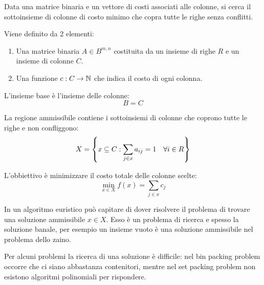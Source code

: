 \documentclass[\main/main.tex]{subfiles}
\begin{document}
\begin{multicols}{2}
    \begin{problem}
        Data una matrice binaria e un vettore di costi associati alle colonne, si cerca il sottoinsieme di colonne di costo minimo che copra tutte le righe senza conflitti.
        
        Viene definito da 2 elementi:
        \begin{enumerate}
            \item Una matrice binaria \(A \in B^{m,n}\) costituita da un insieme di righe \(R\) e un insieme di colonne \(C\).
            \item Una funzione \(c: C \rightarrow \mathbb{N}\) che indica il costo di ogni colonna.
        \end{enumerate}
    \end{problem}
    \begin{definition}
        L'insieme base è l'insieme delle colonne:
        \[
            B = C
        \]
    \end{definition}
    \begin{definition}
        La regione ammissibile contiene i sottoinsiemi di colonne che coprono tutte le righe e non confliggono:
        \[
            X = \left\{x \subseteq C: \sum_{j \in x} a_{ij} = 1 \quad \forall i \in R\right\}
        \]
    \end{definition}
    \begin{definition}
        L'obbiettivo è minimizzare il costo totale delle colonne scelte:
        \[
            \min_{x \in X} f(x) = \sum_{j \in x} c_j
        \]
    \end{definition}
    \begin{observation}
        In un algoritmo euristico può capitare di dover risolvere il problema di trovare una soluzione ammissibile \(x \in X\). Esso è un problema di ricerca e spesso la soluzione banale, per esempio un insieme vuoto è una soluzione ammissibile nel problema dello zaino.
        
        Per alcuni problemi la ricerca di una soluzione è difficile: nel bin packing problem occorre che ci siano abbastanza contenitori, mentre nel set packing problem non esistono algoritmi polinomiali per rispondere.
        

\end{observation}
\end{multicols}
\end{document}
